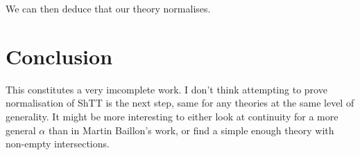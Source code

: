 \documentclass[11pt]{article}
\newcommand{\0}{\mathbf{0}}
\newcommand{\1}{\mathbf{1}}
\begin{document}
We can then deduce that our theory normalises.


\section{Conclusion}

This constitutes a very imcomplete work. I don't think attempting to prove normalisation of ShTT is the next step, same for any theories at the same level of generality. It might be more interesting to either look at continuity for a more general $\alpha$ than in Martin Baillon's work, or find a simple enough theory with non-empty intersections.

%
%

\printbibliography
\end{document}
